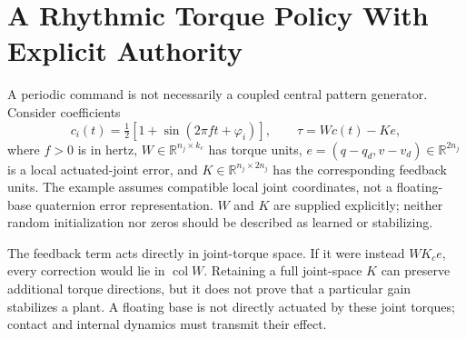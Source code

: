 \section{A Rhythmic Torque Policy With Explicit Authority}

A periodic command is not necessarily a coupled central pattern generator.
Consider coefficients
\begin{equation}
 c_i(t)=\tfrac12[1+\sin(2\pi f t+\varphi_i)],\qquad
 \tau=Wc(t)-Ke,
 \label{eq:ch11:rhythmic-policy}
\end{equation}
where $f>0$ is in hertz, $W\in\mathbb R^{n_j\times k_c}$ has torque units,
$e=(q-q_d,v-v_d)\in\mathbb R^{2n_j}$ is a local actuated-joint error, and
$K\in\mathbb R^{n_j\times2n_j}$ has the corresponding feedback units.
The example assumes compatible local joint coordinates, not a floating-base
quaternion error representation. $W$ and $K$ are supplied explicitly; neither
random initialization nor zeros should be described as learned or stabilizing.

The feedback term acts directly in joint-torque space. If it were instead
$WK_c e$, every correction would lie in $\operatorname{col}W$. Retaining a
full joint-space $K$ can preserve additional torque directions, but it does
not prove that a particular gain stabilizes a plant. A floating base is not
directly actuated by these joint torques; contact and internal dynamics must
transmit their effect.

